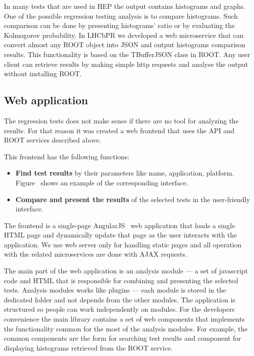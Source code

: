 \documentclass[a4paper]{jpconf}
\begin{document}
In many tests that are used in HEP the output contains histograms and graphs.
One of the possible regression testing analysis is to compare histograms. Such
comparison can be done by presenting histograms' ratio or by evaluating the
Kolmogorov probability. In LHCbPR we developed a web microservice that can
convert almost any ROOT object into JSON and output histograms comparison
results. This functionality is based on the TBufferJSON class in ROOT. Any user
client can retrieve results by making simple http requests and analyse the
output without installing ROOT.


\subsection{Web application}\label{sec:webapp}

The regression tests does not make sense if there are no tool for analyzing the
results. For that reason it was created a web frontend that uses the API and
ROOT services described above.

This frontend has the following functions:
\begin{itemize}
\item \textbf{Find test results} by their parameters like name, application,
platform. Figure~ shows an example of the corresponding
interface.
\item \textbf{Compare and present the results} of the selected tests in the user-friendly interface.
\end{itemize}

The frontend is a single-page AngularJS~\cite{angular} web application that loads a single HTML page and
dynamically update that page as the user interacts with the application. We use
web server only for handling static pages and all operation with the related
microservices are done with AJAX requests.

The main part of the web application is an analysis module --- a set of
javascript code and HTML that is responsible for combining and presenting the
selected tests. Analysis modules works like plugins --- each module is stored in
the dedicated folder and not depends from the other modules. The application is
structured so people can work independently on modules. For the developers
convenience the main library contains a set of web components that implements
the functionality common for the most of the analysis modules. For example, the
common components are the form for searching test results and component for
displaying histograms retrieved from the ROOT service.
\end{document}

